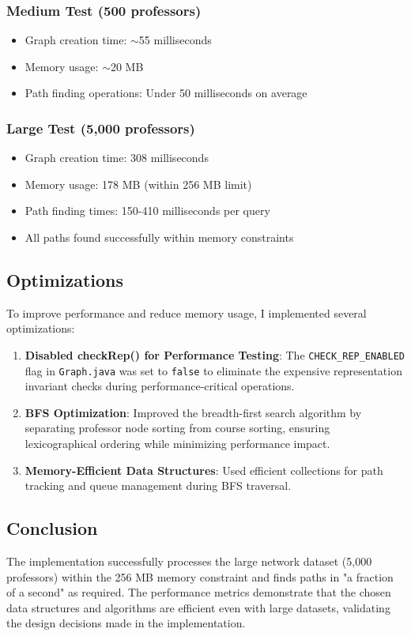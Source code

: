 \documentclass[11pt]{article}
\begin{document}
\subsubsection*{Medium Test (500 professors)}
\begin{itemize}
    \item Graph creation time: $\sim$55 milliseconds
    \item Memory usage: $\sim$20 MB
    \item Path finding operations: Under 50 milliseconds on average
\end{itemize}

\subsubsection*{Large Test (5,000 professors)}
\begin{itemize}
    \item Graph creation time: 308 milliseconds
    \item Memory usage: 178 MB (within 256 MB limit)
    \item Path finding times: 150-410 milliseconds per query
    \item All paths found successfully within memory constraints
\end{itemize}

\subsection*{Optimizations}
To improve performance and reduce memory usage, I implemented several optimizations:

\begin{enumerate}
    \item \textbf{Disabled checkRep() for Performance Testing}: The \texttt{CHECK\_REP\_ENABLED} flag in \texttt{Graph.java} was set to \texttt{false} to eliminate the expensive representation invariant checks during performance-critical operations.
    
    \item \textbf{BFS Optimization}: Improved the breadth-first search algorithm by separating professor node sorting from course sorting, ensuring lexicographical ordering while minimizing performance impact.
    
    \item \textbf{Memory-Efficient Data Structures}: Used efficient collections for path tracking and queue management during BFS traversal.
\end{enumerate}

\subsection*{Conclusion}
The implementation successfully processes the large network dataset (5,000 professors) within the 256 MB memory constraint and finds paths in "a fraction of a second" as required. The performance metrics demonstrate that the chosen data structures and algorithms are efficient even with large datasets, validating the design decisions made in the implementation.
\end{document}
